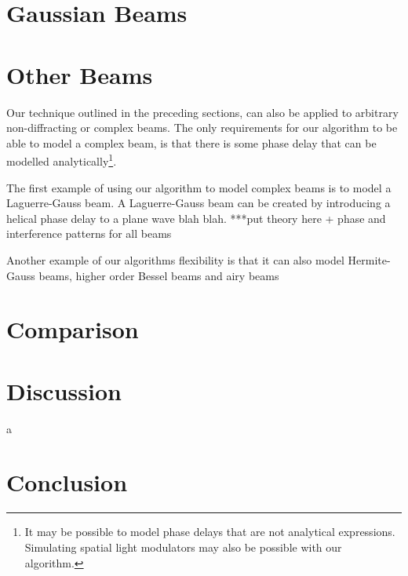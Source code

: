 \section{Gaussian Beams}

% 

\section{Other Beams}

Our technique outlined in the preceding sections, can also be applied to arbitrary non-diffracting or complex beams. The only requirements for our algorithm to be able to model a complex beam, is that there is some phase delay that can be modelled analytically\footnote{It may be possible to model phase delays that are not analytical expressions. Simulating spatial light modulators may also be possible with our algorithm.}.

The first example of using our algorithm to model complex beams is to model a Laguerre-Gauss beam. A Laguerre-Gauss beam can be created by introducing a helical phase delay to a plane wave blah blah. ***put theory here + phase and interference patterns for all beams

Another example of our algorithms flexibility is that it can also model Hermite-Gauss beams, higher order Bessel beams and airy beams

\section{Comparison}

\section{Discussion}


a~\cite{mignon2016fractional}
\section{Conclusion}



